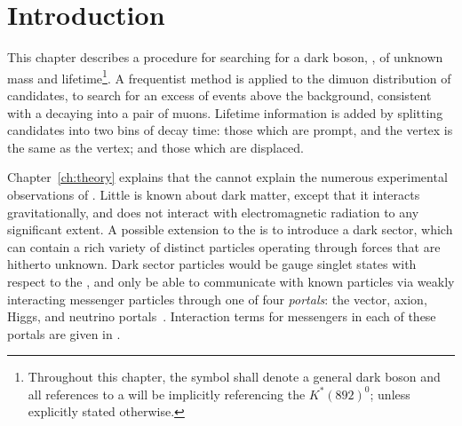 \section{Introduction}
\label{sec:db:intro}


This chapter describes a procedure for searching for a dark boson, \db, of
unknown mass and lifetime\footnote{
  Throughout this chapter, the symbol \db shall denote a general dark boson and all references to
  a \Kstarz will be implicitly referencing the $K^*(892)^0$; unless explicitly stated otherwise.
}.
A frequentist method is applied to the dimuon distribution of \btokstrmumu candidates,
to search for an excess of events above the \sm background, consistent with a \db decaying into a
pair of muons.
Lifetime information is added by
splitting candidates into two bins of decay time: those which are prompt, and the \db vertex is the
same as the \Kstarz vertex; and
those which are displaced.


Chapter~\ref{ch:theory} explains that the \sm cannot explain
the
numerous experimental observations of \dm.
Little is known about dark matter, except that it interacts gravitationally, and does not interact
with electromagnetic radiation to any significant extent.
A possible extension to the \sm is to introduce a dark sector, which can contain a rich variety of
distinct particles operating through forces that are hitherto unknown.
Dark sector particles would be gauge singlet states with respect to the \sm, and
only be able to communicate with known particles via weakly interacting messenger particles
through one of four \emph{portals}: the vector, axion, Higgs, and neutrino
portals~\cite{Essig:2013lka}.
Interaction terms for messengers in each of these portals are given in
.

